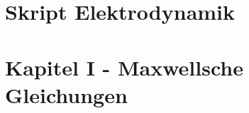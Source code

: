 \documentclass{article}
\begin{document}
\section*{Skript Elektrodynamik}



\section{Kapitel I - Maxwellsche Gleichungen}
\end{document}
